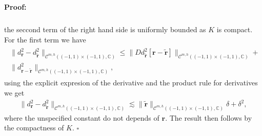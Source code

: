 \documentclass{article}
\newenvironment{proof}{\paragraph{Proof:}}{\hfill$\square$}
\newcommand{\IC}{{\mathbb C}}
\newcommand{\cmspaceh}[4]{\mathcal{C}^{#1,#2} \left( #3, #4 \right)}
\newcommand{\br}{\bm{r}}
\newcommand{\iinterv}{(-1,1)\times(-1,1)}
\begin{document}
\begin{proof}
\begin{align*}
\end{align*}
the seccond term of the right hand side is uniformly bounded as $K$ is compact. For the first term we have
\begin{align*}
\begin{split}
\|d^2_{\br}  - d_{\widetilde{\br}}^2 \|_{\cmspaceh{m}{h}{\iinterv}{\IC}} \leq 
\|D d^2_{\widetilde{\br}}[\br - \widetilde{\br}]\|_{\cmspaceh{m}{h}{\iinterv}{\IC}} +\\ \| d^2_{\br -\widetilde{\br}}\|_{\cmspaceh{m}{h}{\iinterv}{\IC}},
\end{split}
\end{align*} 
 using the explicit expresion of the derivative and the product rule for derivatives we get
\begin{align*}
\|d^2_{\br}  - d_{\widetilde{\br}}^2 \|_{\cmspaceh{m}{h}{\iinterv}{\IC}} \lesssim 
\|\widetilde{\br}\|_{\cmspaceh{m}{h}{\iinterv}{\IC}} \delta  + \delta^2,
\end{align*}
where the unspecified constant do not depends of $\br$. The result then follows by the compactness of $K$.
\end{proof}
\end{document}
